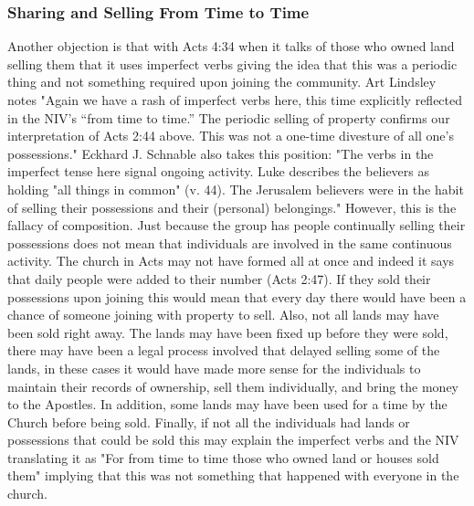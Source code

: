 \documentclass[11pt]{article}
\begin{document}
\subsubsection{Sharing and Selling From Time to Time}
Another objection is that with Acts 4:34 when it talks of those who owned land selling them that it uses imperfect verbs giving the idea that this was a periodic thing and not something required upon joining the community. Art Lindsley notes "Again we have a rash of imperfect verbs here, this time explicitly reflected in the NIV’s “from time to time.” The periodic selling of property confirms our interpretation of Acts 2:44 above. This was not a one-time divesture of all one’s possessions." \cite{gospel coalition} Eckhard J. Schnable also takes this position: "The verbs in the imperfect tense here signal ongoing activity. Luke describes the believers as holding "all things in common" (v. 44). The Jerusalem believers were in the habit of selling their possessions and their (personal) belongings." \cite{habit selling possessions} However, this is the fallacy of composition. Just because the group has people continually selling their possessions does not mean that individuals are involved in the same continuous activity. The church in Acts may not have formed all at once and indeed it says that daily people were added to their number (Acts 2:47). If they sold their possessions upon joining this would mean that every day there would have been a chance of someone joining with property to sell. Also, not all lands may have been sold right away. The lands may have been fixed up before they were sold, there may have been a legal process involved that delayed selling some of the lands, in these cases it would have made more sense for the individuals to maintain their records of ownership, sell them individually, and bring the money to the Apostles. In addition, some lands may have been used for a time by the Church before being sold. 
Finally, if not all the individuals had lands or possessions that could be sold this may explain the imperfect verbs and the NIV translating it as "For from time to time those who owned land or houses sold them" implying that this was not something that happened with everyone in the church.
\end{document}
